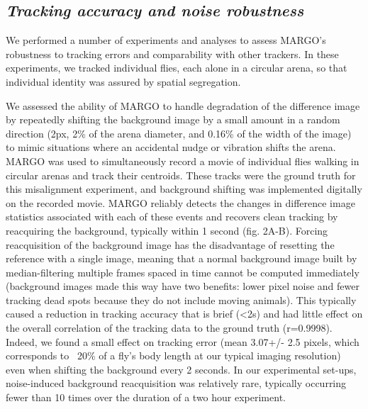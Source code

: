 \documentclass[10pt,letterpaper]{article}
\begin{document}
\subsection*{\textit{Tracking accuracy and noise robustness}}

We performed a number of experiments and analyses to assess MARGO's robustness to tracking errors and comparability with other trackers. In these experiments, we tracked individual flies, each alone in a circular arena, so that individual identity was assured by spatial segregation.

We assessed the ability of MARGO to handle degradation of the difference image by repeatedly shifting the background image by a small amount in a random direction (2px, 2\% of the arena diameter, and 0.16\% of the width of the image) to mimic situations where an accidental nudge or vibration shifts the arena. MARGO was used to simultaneously record a movie of individual flies walking in circular arenas and track their centroids. These tracks were the ground truth for this misalignment experiment, and background shifting was implemented digitally on the recorded movie. MARGO reliably detects the changes in difference image statistics associated with each of these events and recovers clean tracking by reacquiring the background, typically within 1 second (fig. 2A-B). Forcing reacquisition of the background image has the disadvantage of resetting the reference with a single image, meaning that a normal background image built by median-filtering multiple frames spaced in time cannot be computed immediately (background images made this way have two benefits: lower pixel noise and fewer tracking dead spots because they do not include moving animals). This typically caused a reduction in tracking accuracy that is brief (<2s) and had little effect on the overall correlation of the tracking data to the ground truth (r=0.9998). Indeed, we found a small effect on tracking error (mean 3.07+/- 2.5 pixels, which corresponds to ~20\% of a fly's body length at our typical imaging resolution) even when shifting the background every 2 seconds. In our experimental set-ups, noise-induced background reacquisition was relatively rare, typically occurring fewer than 10 times over the duration of a two hour experiment.
\end{document}
